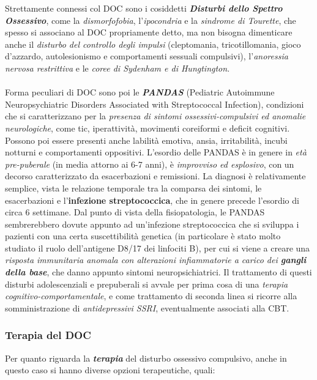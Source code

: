 Strettamente connessi col DOC sono i cosiddetti \textbf{\emph{Disturbi
dello Spettro Ossessivo}}, come la \emph{dismorfofobia},
l'\emph{ipocondria} e la \emph{sindrome di Tourette}, che spesso si
associano al DOC propriamente detto, ma non bisogna dimenticare anche il
\emph{disturbo del controllo degli impulsi} (cleptomania,
tricotillomania, gioco d'azzardo, autolesionismo e comportamenti
sessuali compulsivi), l'\emph{anoressia nervosa restrittiva} e le
\emph{coree di Sydenham e di Hungtington}.
\\\\
Forma peculiari di DOC sono poi le \textbf{\emph{PANDAS}} (Pediatric
Autoimmune Neuropsychiatric Disorders Associated with Streptococcal
Infection), condizioni che si caratterizzano per la \emph{presenza di
sintomi ossessivi-compulsivi ed anomalie neurologiche}, come tic,
iperattività, movimenti coreiformi e deficit cognitivi. Possono poi
essere presenti anche labilità emotiva, ansia, irritabilità, incubi
notturni e comportamenti oppositivi. L'esordio delle PANDAS è in genere
in \emph{età pre-puberale} (in media attorno ai 6-7 anni), è
\emph{improvviso ed esplosivo}, con un decorso caratterizzato da
esacerbazioni e remissioni. La diagnosi è relativamente semplice, vista
le relazione temporale tra la comparsa dei sintomi, le esacerbazioni e
l'\textbf{infezione streptococcica}, che in genere precede l'esordio di
circa 6 settimane. Dal punto di vista della fisiopatologia, le PANDAS
sembrerebbero dovute appunto ad un'infezione streptococcica che si
sviluppa i pazienti con una certa suscettibilità genetica (in
particolare è stato molto studiato il ruolo dell'antigene D8/17 dei
linfociti B), per cui si viene a creare una \emph{risposta immunitaria
anomala con alterazioni infiammatorie a carico dei \textbf{gangli della
base}}, che danno appunto sintomi neuropsichiatrici. Il trattamento di
questi disturbi adolescenziali e prepuberali si avvale per prima cosa di
una \emph{terapia cognitivo-comportamentale}, e come trattamento di
seconda linea si ricorre alla somministrazione di \emph{antidepressivi
SSRI}, eventualmente associati alla CBT.

\subsubsection{Terapia del DOC}

Per quanto riguarda la \textbf{\emph{terapia}} del disturbo ossessivo
compulsivo, anche in questo caso si hanno diverse opzioni terapeutiche,
quali:

